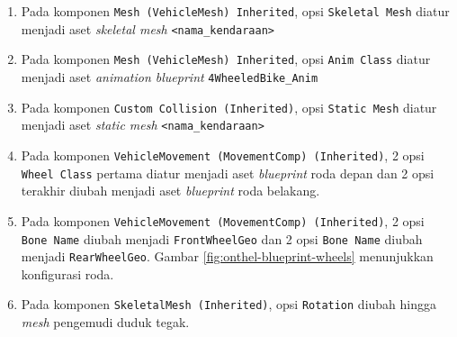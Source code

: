 \begin{enumerate}
    \item Pada komponen \verb|Mesh (VehicleMesh) Inherited|, opsi \verb|Skeletal Mesh|
    diatur menjadi aset \textit{skeletal mesh} \verb|<nama_kendaraan>|
    \item Pada komponen \verb|Mesh (VehicleMesh) Inherited|, opsi \verb|Anim Class|
    diatur menjadi aset \textit{animation blueprint} \verb|4WheeledBike_Anim|
    \item Pada komponen \verb|Custom Collision (Inherited)|, opsi \verb|Static Mesh|
    diatur menjadi aset \textit{static mesh} \verb|<nama_kendaraan>|
    \item Pada komponen \verb|VehicleMovement (MovementComp) (Inherited)|, 2
    opsi \verb|Wheel Class| pertama diatur menjadi aset \textit{blueprint} roda
    depan dan 2 opsi terakhir diubah menjadi aset \textit{blueprint} roda
    belakang.
    \item Pada komponen \verb|VehicleMovement (MovementComp) (Inherited)|, 2
    opsi \verb|Bone Name| diubah menjadi \verb|FrontWheelGeo| dan 2 opsi
    \verb|Bone Name| diubah menjadi \verb|RearWheelGeo|. Gambar
    \ref{fig:onthel-blueprint-wheels} menunjukkan konfigurasi roda.
    \item Pada komponen \verb|SkeletalMesh (Inherited)|, opsi \verb|Rotation|
    diubah hingga \textit{mesh} pengemudi duduk tegak.
\end{enumerate}

